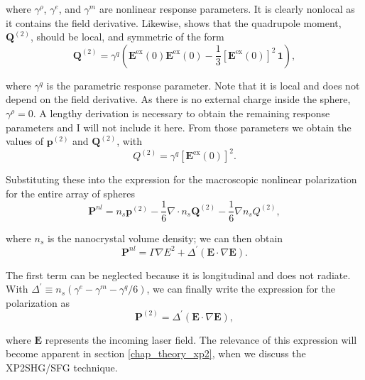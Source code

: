 where $\gamma^{\rho}$, $\gamma^{e}$, and $\gamma^{m}$ are nonlinear response parameters. It is clearly nonlocal as it contains the field derivative. Likewise, \cite{brudny2000second} shows that the quadrupole moment, $\mathbf{Q}^{(2)}$, should be local, and symmetric of the form
\begin{equation}
\mathbf{Q}^{(2)} = \gamma^{q}\left(\mathbf{E}^{\text{ex}}(0)\mathbf{E}^{\text{ex}}(0) - \frac{1}{3}[\mathbf{E}^{\text{ex}}(0)]^{2}\,\mathbf{1}\right),
\end{equation}

where $\gamma^{q}$ is the parametric response parameter. Note that it is local and does not depend on the field derivative. As there is no external charge inside the sphere, $\gamma^{\rho} = 0$. A lengthy derivation is necessary to obtain the remaining response parameters and I will not include it here. From those parameters we obtain the values of $\mathbf{p}^{(2)}$ and $\mathbf{Q}^{(2)}$, with
\begin{equation}
Q^{(2)} = \gamma^{q}\left[\mathbf{E}^{\text{ex}}(0)\right]^{2}.
\end{equation}

Substituting these into the expression for the macroscopic nonlinear polarization for the entire array of spheres
\begin{equation}
\mathbf{P}^{nl} = n_{s}\mathbf{p}^{(2)} - \frac{1}{6}\nabla\cdot n_{s}\mathbf{Q}^{(2)} - \frac{1}{6}\nabla n_{s}Q^{(2)},
\end{equation}

where $n_{s}$ is the nanocrystal volume density; we can then obtain
\begin{equation}
\mathbf{P}^{nl} = \Gamma\nabla E^{2} + \Delta^{\prime}\left(\mathbf{E}\cdot\nabla\mathbf{E}\right).
\end{equation}

The first term can be neglected because it is longitudinal and does not radiate. With $\Delta^{'}\equiv n_{s}\left(\gamma^{e} - \gamma^{m} - \gamma^{q}/6\right)$, we can finally write the expression for the polarization as
\begin{equation}
\mathbf{P}^{(2)} = \Delta^{\prime}\left(\mathbf{E}\cdot\nabla\mathbf{E}\right),\label{eq_mochan_p}
\end{equation}

where $\mathbf{E}$ represents the incoming laser field. The relevance of this expression will become apparent in section \ref{chap_theory_xp2}, when we discuss the XP2SHG/SFG technique.

